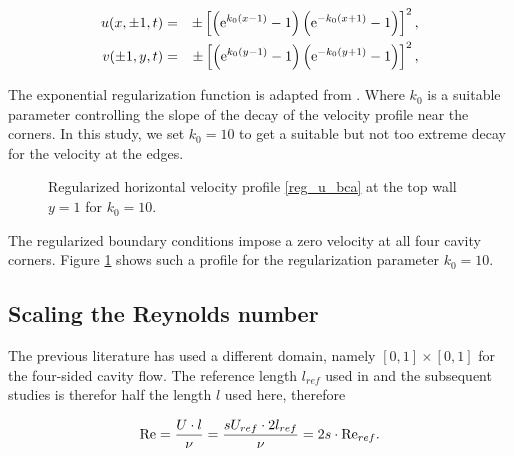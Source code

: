 \begin{eqnarray}
u(x,\pm 1,t) & = & \pm\left[\left(\mathrm{e}^{k_0(x - 1)} - 1\right)
  \left(\mathrm{e}^{-k_0(x + 1)} - 1\right)\right]^2,\label{reg_u_bca} \\
v(\pm 1,y,t) & = & \pm\left[\left(\mathrm{e}^{k_0(y - 1)} - 1\right)
  \left(\mathrm{e}^{-k_0(y + 1)} - 1\right)\right]^2,\label{reg_u_bcb}
\end{eqnarray}

The exponential regularization function is adapted from \citet{lopez2017}. Where
$k_0$ is a suitable parameter controlling the slope of the decay of the
velocity profile near the corners. In this study, we set $k_0=10$ to get a
suitable but not too extreme decay for the velocity at the edges. 

\begin{figure}[ht]
\center
{}
\caption{\label{bc_profile} Regularized horizontal velocity profile
  \eqref{reg_u_bca} at the top wall $y=1$ for $k_0=10$.}
\end{figure}

The regularized boundary conditions impose a zero velocity at all four cavity
corners. Figure \ref{bc_profile} shows such a profile for the regularization
parameter $k_0=10$.

\subsection{Scaling the Reynolds number}

The previous literature has used a different domain, namely $[0,1] \times
[0,1]$ for the four-sided cavity flow. The reference length $l_{ref}$ used in
\citet{wahba2009} and the subsequent studies is therefor half the length $l$
used here, therefore

\begin{align}
\mathrm{Re} = \frac{U \cdot l}{\nu} 
  = \frac{sU_{ref} \cdot 2l_{ref}}{\nu} = 2s \cdot \mathrm{Re}_{ref}.
\end{align}

